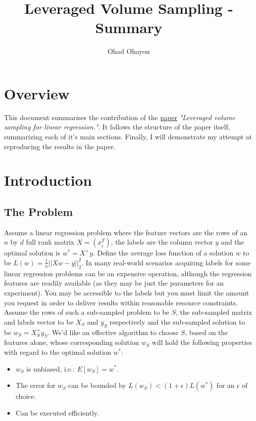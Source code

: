 \documentclass{article}
\begin{document}
	\title{Leveraged Volume Sampling - Summary}
	\author{Ohad Ohayon}
	\maketitle
	\newpage


    \tableofcontents
    \newpage

    \section{Overview}
        This document summarises the contribution of the {\color{blue}\href{https://arxiv.org/abs/1802.06749}{\underline{paper}}} \textit{"Leveraged volume sampling for linear regression."}.
        It follows the structure of the paper itself, summarizing each of it's main sections.
        Finally, I will demonstrate my attempt at reproducing the results in the paper.

    \section{Introduction}
        \subsection{The Problem}
            Assume a linear regression problem where the feature vectors are the rows of an $n$ by $d$ full rank matrix $X=(x_{i}^T)$,
            the labels are the column vector $y$ and the optimal solution is $w^\ast=X^+y$.
            Define the average loss function of a solution $w$ to be $L(w)=\frac{1}{n}||Xw-y||_{2}^2$.
            In many real-world scenarios acquiring labels for some linear regression problems can be an expensive operation,
            although the regression features are readily available (as they may be just the parameters for an experiment).
            You may be accessible to the labels but you must limit the amount you request in order to deliver results within
            reasonable resource constraints.
            Assume the rows of such a sub-sampled problem to be $S$, the sub-sampled matrix and labels vector to be $X_{S}$
            and $y_{S}$ respectively and the sub-sampled solution to be $w_{S}=X_{S}^+y_{S}$.
            We'd like an effective algorithm to choose $S$, based on the features alone, whose corresponding solution $w_{S}$
            will hold the following properties with regard to the optimal solution $w^\ast$:
            \begin{itemize}
                \item $w_{S}$ is unbiased, i.e.: $E[w_{S}]=w^\ast$.
                \item The error for $w_{S}$ can be bounded by $L(w_{S}) < (1+\epsilon)L(w^\ast)$ for an $\epsilon$ of choice.
                \item Can be executed efficiently.
            \end{itemize}
\end{document}

